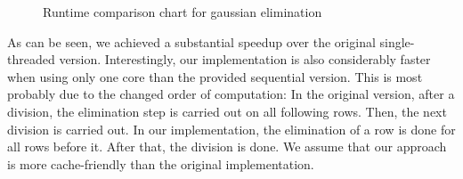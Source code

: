 \documentclass[]{article}
\begin{document}
\begin{figure}[h]
	\centering
	\caption{Runtime comparison chart for gaussian elimination}
	\label{fig:gauss-chart}
\end{figure}

As can be seen, we achieved a substantial speedup over the original single-threaded version.
Interestingly, our implementation is also considerably faster when using only one core than the provided sequential version.
This is most probably due to the changed order of computation: In the original version, after a division, the elimination step is carried out on all following rows. Then, the next division is carried out. In our implementation, the elimination of a row is done for all rows before it. After that, the division is done.
We assume that our approach is more cache-friendly than the original implementation.

\FloatBarrier
\clearpage
\newpage

\begin{appendices}
\end{appendices}
\end{document}
